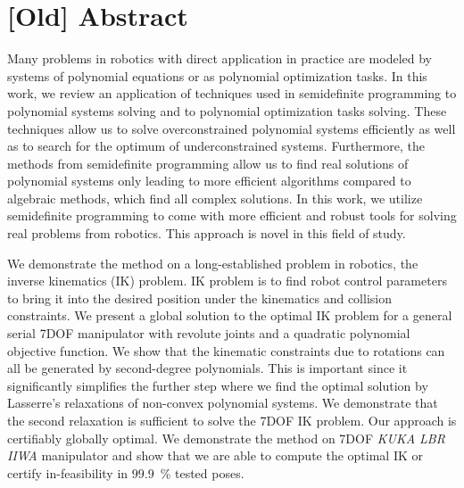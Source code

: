 \chapter*{[Old] Abstract}
Many problems in robotics with direct application in practice are modeled by systems of polynomial equations or as polynomial optimization tasks.
In this work, we review an application of techniques used in semidefinite programming to polynomial systems solving and to polynomial optimization tasks solving.
These techniques allow us to solve overconstrained polynomial systems efficiently as well as to search for the optimum of underconstrained systems.
Furthermore, the methods from semidefinite programming allow us to find real solutions of polynomial systems only leading to more efficient algorithms compared to algebraic methods, which find all complex solutions.
In this work, we utilize semidefinite programming to come with more efficient and robust tools for solving real problems from robotics.
This approach is novel in this field of study.

We demonstrate the method on a long-established problem in robotics, the inverse kinematics (IK) problem.
IK problem is to find robot control parameters to bring it into the desired position under the kinematics and collision constraints.
We present a global solution to the optimal IK problem for a general serial 7DOF manipulator with revolute joints and a quadratic polynomial objective function.
We show that the kinematic constraints due to rotations can all be generated by second-degree polynomials.
This is important since it significantly simplifies the further step where we find the optimal solution by Lasserre's relaxations of non-convex polynomial systems.
We demonstrate that the second relaxation is sufficient to solve the 7DOF IK problem.
Our approach is certifiably globally optimal.
We demonstrate the method on 7DOF \textit{KUKA LBR IIWA} manipulator and show that we are able to compute the optimal IK or certify in-feasibility in $99.9$~\% tested poses.
